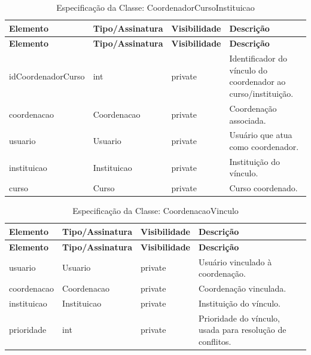 \fonteautores

\vspace{\baselineskip}

\Needspace{0.32\textheight}
\begin{longtable}{|L{3.5cm}|L{3.5cm}|L{3.5cm}|L{3.5cm}|}
\caption{Especificação da Classe: CoordenadorCursoInstituicao} \\
\hline
\textbf{Elemento} & \textbf{Tipo/Assinatura} & \textbf{Visibilidade} & \textbf{Descrição} \\
\hline
\endfirsthead
\hline
\textbf{Elemento} & \textbf{Tipo/Assinatura} & \textbf{Visibilidade} & \textbf{Descrição} \\
\hline
\endhead
idCoordenadorCurso & int & private & Identificador do vínculo do coordenador ao curso/instituição. \\
\hline
coordenacao & Coordenacao & private & Coordenação associada. \\
\hline
usuario & Usuario & private & Usuário que atua como coordenador. \\
\hline
instituicao & Instituicao & private & Instituição do vínculo. \\
\hline
curso & Curso & private & Curso coordenado. \\
\hline
\end{longtable}

\fonteautores

\vspace{\baselineskip}

\Needspace{0.32\textheight}
\begin{longtable}{|L{3.5cm}|L{3.5cm}|L{3.5cm}|L{3.5cm}|}
\caption{Especificação da Classe: CoordenacaoVinculo} \\
\hline
\textbf{Elemento} & \textbf{Tipo/Assinatura} & \textbf{Visibilidade} & \textbf{Descrição} \\
\hline
\endfirsthead
\hline
\textbf{Elemento} & \textbf{Tipo/Assinatura} & \textbf{Visibilidade} & \textbf{Descrição} \\
\hline
\endhead
usuario & Usuario & private & Usuário vinculado à coordenação. \\
\hline
coordenacao & Coordenacao & private & Coordenação vinculada. \\
\hline
instituicao & Instituicao & private & Instituição do vínculo. \\
\hline
prioridade & int & private & Prioridade do vínculo, usada para resolução de conflitos. \\
\hline
\end{longtable}

